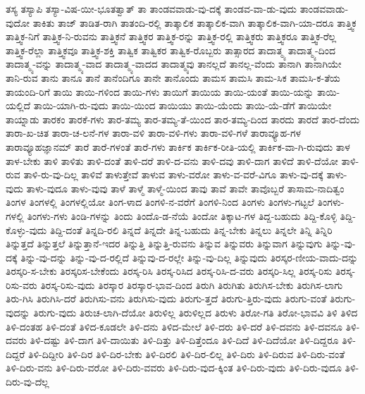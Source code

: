 {ತಸ್ಯ
ತಸ್ಯಾಪಿ
ತಸ್ಯಾ-ವಿಷ-ಯೀ-ಭೂತತ್ವಾತ್
ತಾ
ತಾಂಡವವಾಡು-ವು-ದಕ್ಕೆ
ತಾಂಡವ-ವಾ-ಡು-ವುದು
ತಾಂಡವವಾಡು-ವುದೋ
ತಾಕಿತು
ತಾಜ್
ತಾಡಿತ-ರಾಗಿ
ತಾತಂದಿ-ರಲ್ಲಿ
ತಾತ್ಕಾಲಿಕ
ತಾತ್ಕಾಲಿಕ-ವಾಗಿ
ತಾತ್ಕಾಲಿಕ-ವಾಗಿ-ಯಾ-ದರೂ
ತಾತ್ತ್ವಿಕ
ತಾತ್ತ್ವಿಕ-ನಿಗೆ
ತಾತ್ತ್ವಿಕ-ನಿ-ರುವನು
ತಾತ್ತ್ವಿಕನೆ
ತಾತ್ತ್ವಿಕರ
ತಾತ್ತ್ವಿಕ-ರನ್ನು
ತಾತ್ತ್ವಿಕ-ರಲ್ಲಿ
ತಾತ್ತ್ವಿಕರು
ತಾತ್ತ್ವಿಕರೂ
ತಾತ್ತ್ವಿಕ-ರೆಲ್ಲ
ತಾತ್ತ್ವಿಕ-ರೆಲ್ಲಾ
ತಾತ್ತ್ವಿಕವೂ
ತಾತ್ತ್ವಿಕ-ಶಕ್ತಿ
ತಾತ್ವಿಕ
ತಾತ್ವಿಕರ
ತಾತ್ವಿಕ-ರೊಬ್ಬರು
ತಾತ್ಸಾರದ
ತಾದಾತ್ಮ್ಯ
ತಾದಾತ್ಮ್ಯ-ದಿಂದ
ತಾದಾತ್ಮ್ಯ-ವನ್ನು
ತಾದಾತ್ಮ್ಯ-ವಾದ
ತಾದಾತ್ಮ್ಯ-ವಾದದ
ತಾದಾತ್ಮ್ಯವು
ತಾನಲ್ಲದೆ
ತಾನಲ್ಲ-ವೆಂದು
ತಾನಾಗಿ
ತಾನಾಗಿಯೇ
ತಾನಿ-ರುವ
ತಾನು
ತಾನೂ
ತಾನೆ
ತಾನೆಂದಿಗೂ
ತಾನೇ
ತಾನೊಂದು
ತಾಮಸ
ತಾಮಸಿ
ತಾಮ-ಸಿಕ
ತಾಮಸಿ-ಕ-ತೆಯ
ತಾಯಂದಿ-ರಿಗೆ
ತಾಯಿ
ತಾಯಿ-ಗಳಿಂದ
ತಾಯಿ-ಗಳು
ತಾಯಿಗೆ
ತಾಯಿಯ
ತಾಯಿ-ಯಂತೆ
ತಾಯಿ-ಯನ್ನು
ತಾಯಿ-ಯಲ್ಲಿದೆ
ತಾಯಿ-ಯಾಗಿ-ರು-ವುದು
ತಾಯಿ-ಯಿಂದ
ತಾಯಿಯು
ತಾಯಿ-ಯೆಂದು
ತಾಯಿ-ಯೆ-ಡೆಗೆ
ತಾಯಿಯೇ
ತಾಯ್ನಾಡು
ತಾರಕಂ
ತಾರಕೆ-ಗಳು
ತಾರ-ತಮ್ಯ
ತಾರ-ತಮ್ಯ-ತೆ-ಯಿಂದ
ತಾರ-ತಮ್ಯ-ದಿಂದ
ತಾರದು
ತಾರದೆ
ತಾರ-ದೆಂದು
ತಾರಾ-ಖ-ಚಿತ
ತಾರಾ-ಚ-ಲನೆ-ಗಳ
ತಾರಾ-ವಳಿ
ತಾರಾ-ವಳಿ-ಗಳು
ತಾರಾ-ವಳಿ-ಗಳೆ
ತಾರಾವ್ಯೂಹ-ಗಳ
ತಾರಾವ್ಯೂಹಜ್ಞಾನಮ್
ತಾರೆ
ತಾರೆ-ಗಳಂತೆ
ತಾರೆ-ಗಳು
ತಾರ್ಕಿಕ
ತಾರ್ಕಿಕ-ರೀತಿ-ಯಲ್ಲಿ
ತಾರ್ಕಿಕ-ವಾ-ಗಿ-ರುವುದು
ತಾಳ
ತಾಳ-ಬೇಕು
ತಾಳಿ
ತಾಳಿತು
ತಾಳಿ-ದಂತೆ
ತಾಳಿ-ದರೆ
ತಾಳಿ-ದ-ವನು
ತಾಳಿ-ದವು
ತಾಳಿ-ದಾಗ
ತಾಳಿದೆ
ತಾಳಿ-ದೆಯೋ
ತಾಳಿ-ರುವ
ತಾಳಿ-ರು-ವು-ದಿಲ್ಲ
ತಾಳಿವೆ
ತಾಳುತ್ತೇವೆ
ತಾಳುವ
ತಾಳು-ವರೋ
ತಾಳು-ವ-ವರೆ-ವಿಗೂ
ತಾಳು-ವು-ದಕ್ಕೆ
ತಾಳು-ವುದು
ತಾಳು-ವುದೂ
ತಾಳು-ವುವು
ತಾಳೆ
ತಾಳ್ಮೆ
ತಾಳ್ಮೆ-ಯಿಂದ
ತಾವು
ತಾವೆ
ತಾವೇ
ತಾವೊಬ್ಬರೆ
ತಾಸಾಮ-ನಾದಿತ್ವಂ
ತಿಂಗಳ
ತಿಂಗಳಲ್ಲಿ
ತಿಂಗಳಲ್ಲಿಯೋ
ತಿಂಗ-ಳಾದ
ತಿಂಗಳಿ-ನ-ವರೆಗೆ
ತಿಂಗಳಿ-ನಿಂದ
ತಿಂಗಳು
ತಿಂಗಳು-ಗಟ್ಟಲೆ
ತಿಂಗಳು-ಗಳಲ್ಲಿ
ತಿಂಗಳು-ಗಳು
ತಿಂಡಿ-ಗಳನ್ನು
ತಿಂದು
ತಿಂದೊ-ಡ-ನೆಯೆ
ತಿಂದೋ
ತಿಕ್ಕಾಟ-ಗಳ
ತಿದ್ದ-ಬಹುದು
ತಿದ್ದಿ-ಕೊಳ್ಳಿ
ತಿದ್ದಿ-ಕೊಳ್ಳು-ವುದು
ತಿದ್ದಿ-ದಂತೆ
ತಿನ್ನದಿ-ರಲಿ
ತಿನ್ನದೆ
ತಿನ್ನದೇ
ತಿನ್ನ-ಬಹುದು
ತಿನ್ನ-ಬೇಕು
ತಿನ್ನಲು
ತಿನ್ನಲೇ
ತಿನ್ನಿ
ತಿನ್ನಿರಿ
ತಿನ್ನುತ್ತದೆ
ತಿನ್ನುತ್ತಲೆ
ತಿನ್ನುತ್ತಾನೆ-ಇದರ
ತಿನ್ನುತ್ತಿ
ತಿನ್ನುತ್ತಿ-ರುವನು
ತಿನ್ನುವ
ತಿನ್ನುವರು
ತಿನ್ನುವಾಗ
ತಿನ್ನುವುಗು
ತಿನ್ನು-ವು-ದಕ್ಕೆ
ತಿನ್ನು-ವು-ದನ್ನು
ತಿನ್ನು-ವು-ದ-ರಲ್ಲಿದೆ
ತಿನ್ನುವು-ದ-ರಲ್ಲೇ
ತಿನ್ನು-ವು-ದಿಲ್ಲ
ತಿನ್ನುವುದು
ತಿರಸ್ಕರ-ಣೀಯ-ವಾದು-ದನ್ನು
ತಿರಸ್ಕರಿ-ಸ-ಬೇಕು
ತಿರಸ್ಕರಿಸ-ಬೇಕೆಂದು
ತಿರಸ್ಕ-ರಿಸಿ
ತಿರಸ್ಕ-ರಿಸಿದ
ತಿರಸ್ಕ-ರಿಸಿ-ದ-ವರು
ತಿರಸ್ಕರಿ-ಸಿಲ್ಲ
ತಿರಸ್ಕ-ರಿಸು
ತಿರಸ್ಕ-ರಿಸು-ವರು
ತಿರಸ್ಕ-ರಿಸು-ವುದು
ತಿರಸ್ಕಾರ
ತಿರಸ್ಕಾರ-ಭಾವ-ದಿಂದ
ತಿರುಗಿ
ತಿರುಗಿತು
ತಿರುಗಿಸ-ಬೇಕು
ತಿರುಗಿಸ-ಲಾಗು
ತಿರು-ಗಿಸಿ
ತಿರುಗಿಸಿ-ದರೆ
ತಿರುಗಿಸು-ವನು
ತಿರುಗಿಸು-ವುದು
ತಿರುಗು-ತ್ತದೆ
ತಿರುಗು-ತ್ತಿರು-ವುದು
ತಿರುಗು-ವಂತೆ
ತಿರುಗು-ವುದನ್ನು
ತಿರುಗು-ವುದು
ತಿರುಚ-ಲಾಗಿ-ದೆಯೋ
ತಿರುಳಿಲ್ಲ
ತಿರುಳಿಲ್ಲದ
ತಿರುಳು
ತಿರೋ-ಗತಿ
ತಿರೋ-ಭಾವವಿ
ತಿಳಿ
ತಿಳಿದ
ತಿಳಿ-ದಂತಹ
ತಿಳಿ-ದಂತೆ
ತಿಳಿದ-ಕೂಡಲೇ
ತಿಳಿ-ದನು
ತಿಳಿದ-ಮೇಲೆ
ತಿಳಿ-ದರು
ತಿಳಿ-ದರೆ
ತಿಳಿ-ದವನು
ತಿಳಿ-ದವನೂ
ತಿಳಿ-ದವರು
ತಿಳಿ-ದಷ್ಟು
ತಿಳಿ-ದಾಗ
ತಿಳಿ-ದಾಯಿತು
ತಿಳಿ-ದಿತ್ತು
ತಿಳಿ-ದಿತ್ತೆಂದೂ
ತಿಳಿ-ದಿದೆ
ತಿಳಿ-ದಿದೆಯೋ
ತಿಳಿ-ದಿದ್ದರೂ
ತಿಳಿ-ದಿದ್ದರೆ
ತಿಳಿ-ದಿದ್ದೀರಿ
ತಿಳಿ-ದಿರ
ತಿಳಿ-ದಿರ-ಬೇಕು
ತಿಳಿ-ದಿರಲಿ
ತಿಳಿ-ದಿರ-ಲಿಲ್ಲ
ತಿಳಿ-ದಿರು
ತಿಳಿ-ದಿರುವ
ತಿಳಿ-ದಿರು-ವಂತೆ
ತಿಳಿ-ದಿರು-ವನು
ತಿಳಿ-ದಿರು-ವರೋ
ತಿಳಿ-ದಿರು-ವವರು
ತಿಳಿ-ದಿರು-ವುದ-ಕ್ಕಿಂತ
ತಿಳಿ-ದಿರು-ವುದು
ತಿಳಿ-ದಿರು-ವುದೂ
ತಿಳಿ-ದಿರು-ವು-ದೆಲ್ಲ
}

